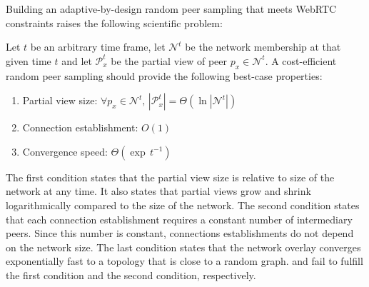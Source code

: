 Building an adaptive-by-design random peer sampling that meets WebRTC
constraints raises the following scientific problem:

\begin{problem}
  Let $t$ be an arbitrary time frame, let $\mathcal{N}^t$ be the
  network membership at that given time $t$ and let $\mathcal{P}_x^t$
  be the partial view of peer $p_x \in \mathcal{N}^t$.  A
  cost-efficient random peer sampling should provide the following
  best-case properties:
  \begin{enumerate}
  \item  \begin{center}
    Partial view size: \hfill
    $\forall p_x \in \mathcal{N}^t,\, |\mathcal{P}_x^t| = \Theta (\ln
    |\mathcal{N}^t|)$
  \end{center}
  
\item \begin{center}
    Connection establishment: \hfill $O(1)$
  \end{center}
 
\item  \begin{center}
    Convergence speed: \hfill $\Theta(\exp \, t^{-1})$
  \end{center}
  \end{enumerate}
\end{problem}

The first condition states that the partial view size is relative to size of the
network at any time. It also states that partial views grow and shrink
logarithmically compared to the size of the network. The second condition
states that each connection establishment requires a constant number of
intermediary peers. Since this number is constant, connections establishments
do not depend on the network size. The last condition states that the network
overlay converges exponentially fast to a topology that is close to a random 
graph.  \CYCLON and \SCAMP fail to fulfill the first condition and the second
condition, respectively.

